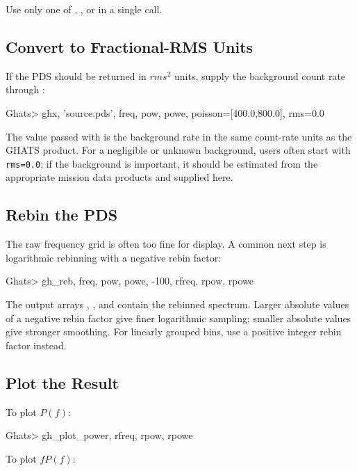 Use only one of , , or
 in a single call.

\subsection*{Convert to Fractional-RMS Units}

If the PDS should be returned in \(rms^2\) units, supply the background count
rate through :

\begin{ghatsconsole}
Ghats> ghx, 'source.pds', freq, pow, powe, poisson=[400.0,800.0], rms=0.0
\end{ghatsconsole}

The value passed with  is the background rate in the same count-rate
units as the GHATS product.  For a negligible or unknown background, users
often start with \texttt{rms=0.0}; if the background is important, it should
be estimated from the appropriate mission data products and supplied here.

\subsection*{Rebin the PDS}

The raw frequency grid is often too fine for display.  A common next step is
logarithmic rebinning with a negative rebin factor:

\begin{ghatsconsole}
Ghats> gh_reb, freq, pow, powe, -100, rfreq, rpow, rpowe
\end{ghatsconsole}

The output arrays , , and  contain the
rebinned spectrum.  Larger absolute values of a negative rebin factor give
finer logarithmic sampling; smaller absolute values give stronger smoothing.
For linearly grouped bins, use a positive integer rebin factor instead.

\subsection*{Plot the Result}

To plot \(P(f)\):

\begin{ghatsconsole}
Ghats> gh_plot_power, rfreq, rpow, rpowe
\end{ghatsconsole}

To plot \(fP(f)\):

